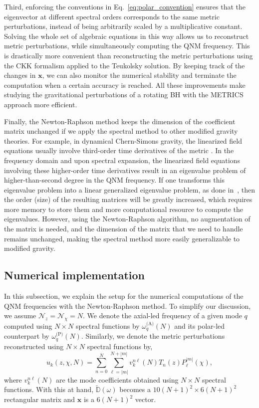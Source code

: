 \documentclass[aps,prx,amsmath,floats,floatfix,twocolumn,
  superscriptaddress,nofootinbib,showpacs]{revtex4-1}
\begin{document}
Third, enforcing the conventions in Eq.~\eqref{eq:polar_convention} ensures that the eigenvector at different spectral orders corresponds to the same metric perturbations, instead of being arbitrarily scaled by a multiplicative constant. 
Solving the whole set of algebraic equations in this way allows us to reconstruct metric perturbations, while simultaneously computing the QNM frequency. 
This is drastically more convenient than reconstructing the metric perturbations using the CKK formalism applied to the Teukolsky solution. 
By keeping track of the changes in $\textbf{x}$,  we can also monitor the numerical stability and terminate the computation when a certain accuracy is reached. 
All these improvements make studying the gravitational perturbations of a rotating BH with the METRICS approach more efficient.

Finally, the Newton-Raphson method keeps the dimension of the coefficient matrix unchanged if we apply the spectral method to other modified gravity theories. For example, in dynamical Chern-Simons gravity, the linearized field equations usually involve third-order time derivatives of the metric \cite{PratikRingdown,Wagle:2021tam}. 
In the frequency domain and upon spectral expansion, the linearized field equations involving these higher-order time derivatives result in an eigenvalue problem of higher-than-second degree in the QNM frequency. 
If one transforms this eigenvalue problem into a linear generalized eigenvalue problem, as done in~\cite{Chung:2023zdq}, then the order (size) of the resulting matrices will be greatly increased, which requires more memory to store them and more computational resource to compute the eigenvalues. 
However, using the Newton-Raphson algorithm, no augmentation of the matrix is needed, and the dimension of the matrix that we need to handle remains unchanged, making the spectral method more easily generalizable to modified gravity.

\subsection{Numerical implementation}
\label{sec:setup}

In this subsection, we explain the setup for the numerical computations of the QNM frequencies with the Newton-Raphson method.
To simplify our discussion, we assume $\mathcal{N}_z = \mathcal{N}_{\chi} = N$. We denote the axial-led frequency of a given mode $q$ computed using $N \times N$ spectral functions by $\omega_q^{\text{(A)}} (N)$ and its polar-led counterpart by $\omega_q^{\text{(P)}} (N)$. 
Similarly, we denote the metric perturbations reconstructed using $N \times N$ spectral functions by, 
\begin{equation}
u_k(z, \chi, N) = \sum_{n=0}^{N} \sum_{\ell=|m|}^{N+|m|} v_k^{n \ell}(N) T_{n}(z) P^{|m|}_{\ell}(\chi),
\end{equation}
where $v_k^{n \ell}(N)$ are the mode coefficients obtained using $N \times N$ spectral functions. With this at hand, $\tilde{\mathbb{D}}(\omega)$ becomes a $10(N+1)^2 \times 6 (N+1)^2 $ rectangular matrix and $\textbf{x}$ is a $6 (N+1)^2$ vector.
\end{document}
